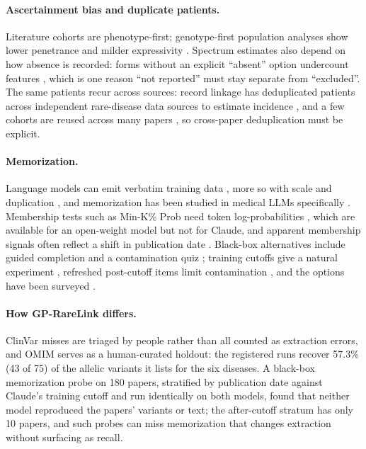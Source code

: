 \documentclass{article} %
\begin{document}
\paragraph{Ascertainment bias and duplicate patients.} Literature cohorts are phenotype-first; genotype-first population analyses show lower penetrance and milder expressivity \citep{Wright2019AssessingPathogenicity,wright2024_penetrance,felker2025_allofus_genotype_first}. Spectrum estimates also depend on how absence is recorded: forms without an explicit ``absent'' option undercount features \citep{vandersluijs2019_arid1b}, which is one reason ``not reported'' must stay separate from ``excluded''. The same patients recur across sources: record linkage has deduplicated patients across independent rare-disease data sources to estimate incidence \citep{konig2019_registry_dedup}, and a few cohorts are reused across many papers \citep{shivakumar2026_cohort_reliance}, so cross-paper deduplication must be explicit.

\paragraph{Memorization.} Language models can emit verbatim training data \citep{Carlini2020ExtractingTraining,Nasr2023ScalableExtraction}, more so with scale and duplication \citep{Carlini2022QuantifyingMemorization}, and memorization has been studied in medical LLMs specifically \citep{li2026_medical_memorization}. Membership tests such as Min-K\% Prob need token log-probabilities \citep{shi2024_mink_prob}, which are available for an open-weight model but not for Claude, and apparent membership signals often reflect a shift in publication date \citep{duan2024_mia_llm}. Black-box alternatives include guided completion \citep{golchin2024_time_travel} and a contamination quiz \citep{Golchin2023DataContamination}; training cutoffs give a natural experiment \citep{roberts2024_lens_of_time}, refreshed post-cutoff items limit contamination \citep{white2025_livebench}, and the options have been surveyed \citep{xu2024_contamination_survey}.

\paragraph{How GP-RareLink differs.} ClinVar misses are triaged by people rather than all counted as extraction errors, and OMIM serves as a human-curated holdout: the registered runs recover 57.3\% (43 of 75) of the allelic variants it lists for the six diseases. A black-box memorization probe on 180 papers, stratified by publication date against Claude's training cutoff and run identically on both models, found that neither model reproduced the papers' variants or text; the after-cutoff stratum has only 10 papers, and such probes can miss memorization that changes extraction without surfacing as recall.
\end{document}
